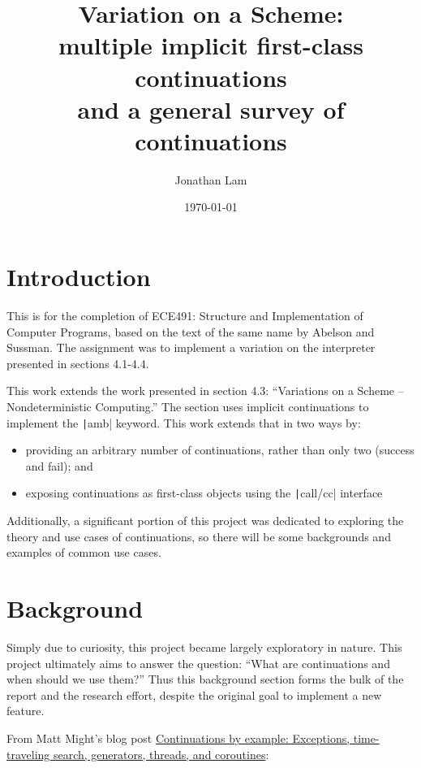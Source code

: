 \documentclass[]{article}
\begin{document}
\title{Variation on a Scheme:\\multiple implicit first-class continuations\\
  \vspace{6pt}
  \large{} and a general survey of continuations}
\author{Jonathan Lam}
\date{\today{}}

\maketitle{}

\section{Introduction}
\label{sec:intr}

This is for the completion of ECE491: Structure and Implementation of Computer Programs, based on the text of the same name by Abelson and Sussman. The assignment was to implement a variation on the interpreter presented in sections 4.1-4.4.

This work extends the work presented in section 4.3: ``Variations on a Scheme -- Nondeterministic Computing.'' The section uses implicit continuations to implement the \texttt|amb| keyword. This work extends that in two ways by:
\begin{itemize}
\item providing an arbitrary number of continuations, rather than only two (success and fail); and
\item exposing continuations as first-class objects using the \texttt|call/cc| interface
\end{itemize}

Additionally, a significant portion of this project was dedicated to exploring the theory and use cases of continuations, so there will be some backgrounds and examples of common use cases.

\section{Background}
\label{sec:back}

Simply due to curiosity, this project became largely exploratory in nature. This project ultimately aims to answer the question: ``What are continuations and when should we use them?'' Thus this background section forms the bulk of the report and the research effort, despite the original goal to implement a new feature.

From Matt Might's blog post \href{https://matt.might.net/articles/programming-with-continuations--exceptions-backtracking-search-threads-generators-coroutines/}{Continuations by example: Exceptions, time-traveling search, generators, threads, and coroutines}:
\end{document}
